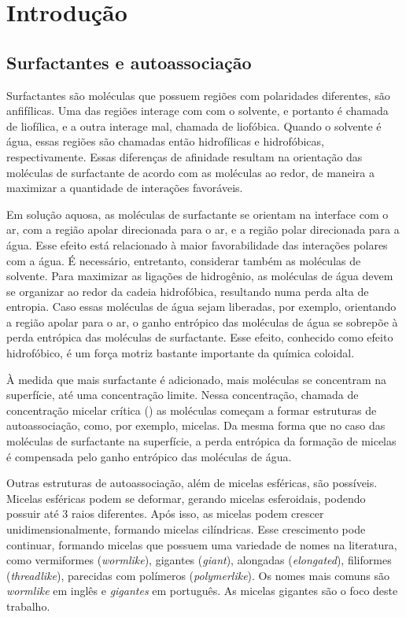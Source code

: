 \part{Introdução}
	\chapter{Surfactantes e autoassociação}
	
	Surfactantes são moléculas que possuem regiões com polaridades diferentes, são anfifílicas. Uma das regiões interage com com o solvente, e portanto é chamada de liofílica, e a outra interage mal, chamada de liofóbica. Quando o solvente é água, essas regiões são chamadas então hidrofílicas e hidrofóbicas, respectivamente. Essas diferenças de afinidade resultam na orientação das moléculas de surfactante de acordo com as moléculas ao redor, de maneira a maximizar a quantidade de interações favoráveis.
	
	
	Em solução aquosa, as moléculas de surfactante se orientam na interface com o ar, com a região apolar direcionada para o ar, e a região polar direcionada para a água. Esse efeito está relacionado à maior favorabilidade das interações polares com a água. É necessário, entretanto, considerar também as moléculas de solvente. Para maximizar as ligações de hidrogênio, as moléculas de água devem se organizar ao redor da cadeia hidrofóbica, resultando numa perda alta de entropia. Caso essas moléculas de água sejam liberadas, por exemplo, orientando a região apolar para o ar, o ganho entrópico das moléculas de água se sobrepõe à perda entrópica das moléculas de surfactante. Esse efeito, conhecido como efeito hidrofóbico, é um força motriz bastante importante da química coloidal.
	
	À medida que mais surfactante é adicionado, mais moléculas se concentram na superfície, até uma concentração limite. Nessa concentração, chamada de concentração micelar crítica (\cmc) as moléculas começam a formar estruturas de autoassociação, como, por exemplo, micelas. Da mesma forma que no caso das moléculas de surfactante na superfície, a perda entrópica da formação de micelas é compensada pelo ganho entrópico das moléculas de água. 
	
	
	Outras estruturas de autoassociação, além de micelas esféricas, são possíveis. Micelas esféricas podem se deformar, gerando micelas esferoidais, podendo possuir até 3 raios diferentes. Após isso, as micelas podem crescer unidimensionalmente, formando micelas cilíndricas. Esse crescimento pode continuar, formando micelas que possuem uma variedade de nomes na literatura, como vermiformes (\emph{wormlike}), gigantes (\emph{giant}), alongadas (\emph{elongated}), filiformes (\emph{threadlike}), parecidas com polímeros (\emph{polymerlike}). Os nomes mais comuns são \emph{wormlike} em inglês e \emph{gigantes} em português. As micelas gigantes são o foco deste trabalho.
		
